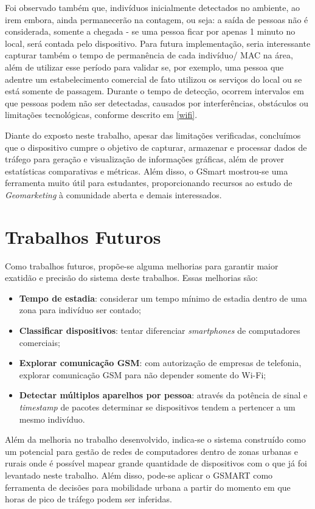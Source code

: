 Foi observado também que, indivíduos inicialmente detectados no ambiente, ao irem embora, ainda permanecerão na contagem, ou seja: a saída de pessoas não é considerada, somente a chegada - se uma pessoa ficar por apenas 1 minuto no local, será contada pelo dispositivo. Para futura implementação, seria interessante capturar também o tempo de permanência de cada indivíduo/ MAC na área, além de utilizar esse período para validar se, por exemplo, uma pessoa que adentre um estabelecimento comercial de fato utilizou os serviços do local ou se está somente de passagem. Durante o tempo de detecção, ocorrem intervalos em que pessoas podem não ser detectadas, causados por interferências, obstáculos ou limitações tecnológicas, conforme descrito em \autoref{wifi}.

Diante do exposto neste trabalho, apesar das limitações verificadas, concluímos que o dispositivo cumpre o objetivo de capturar, armazenar e processar dados de tráfego para geração e visualização de informações gráficas, além de prover estatísticas comparativas e métricas. Além disso, o GSmart mostrou-se uma ferramenta muito útil para estudantes, proporcionando recursos ao estudo de \emph{Geomarketing} à comunidade aberta e demais interessados. 


\section{Trabalhos Futuros}
Como trabalhos futuros, propõe-se alguma melhorias para garantir maior exatidão e
precisão do sistema deste trabalhos. Essas melhorias são:
\begin{itemize}
    \item \textbf{Tempo de estadia}: considerar um tempo mínimo de estadia dentro de uma zona para indivíduo ser
    contado;
    \item \textbf{Classificar dispositivos}: tentar diferenciar \emph{smartphones} de computadores comerciais;
    \item \textbf{Explorar comunicação GSM}: com autorização de empresas de telefonia, explorar comunicação GSM
    para não depender somente do Wi-Fi;
    \item \textbf{Detectar múltiplos aparelhos por pessoa}: através da potência de sinal e \emph{timestamp}
    de pacotes determinar se dispositivos tendem a pertencer a um mesmo indivíduo.
\end{itemize}

Além da melhoria no trabalho desenvolvido, indica-se o sistema construído como um potencial para gestão de redes
de computadores dentro de zonas urbanas e rurais onde é possível mapear grande quantidade de dispositivos com o
que já foi levantado neste trabalho. Além disso, pode-se aplicar o GSMART como ferramenta de decisões para mobilidade
urbana a partir do momento em que horas de pico de tráfego podem ser inferidas.

